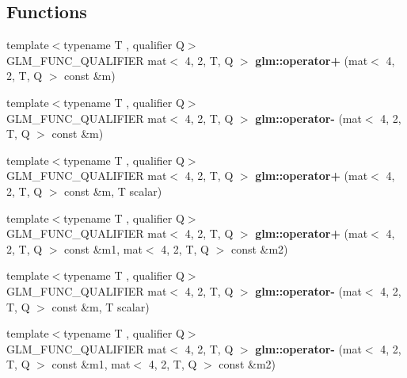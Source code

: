 \subsection*{Functions}
\begin{DoxyCompactItemize}
\item 
\mbox{\label{type__mat4x2_8inl_a5a24a65cc59a2bd4c7770a67105bc7f2}} 
{\footnotesize template$<$typename T , qualifier Q$>$ }\\G\+L\+M\+\_\+\+F\+U\+N\+C\+\_\+\+Q\+U\+A\+L\+I\+F\+I\+ER mat$<$ 4, 2, T, Q $>$ {\bfseries glm\+::operator+} (mat$<$ 4, 2, T, Q $>$ const \&m)
\item 
\mbox{\label{type__mat4x2_8inl_ad9796904f16f8a07d97f8a3baefe44e4}} 
{\footnotesize template$<$typename T , qualifier Q$>$ }\\G\+L\+M\+\_\+\+F\+U\+N\+C\+\_\+\+Q\+U\+A\+L\+I\+F\+I\+ER mat$<$ 4, 2, T, Q $>$ {\bfseries glm\+::operator-\/} (mat$<$ 4, 2, T, Q $>$ const \&m)
\item 
\mbox{\label{type__mat4x2_8inl_aff91c1ef1cd3e33281be9320e6638697}} 
{\footnotesize template$<$typename T , qualifier Q$>$ }\\G\+L\+M\+\_\+\+F\+U\+N\+C\+\_\+\+Q\+U\+A\+L\+I\+F\+I\+ER mat$<$ 4, 2, T, Q $>$ {\bfseries glm\+::operator+} (mat$<$ 4, 2, T, Q $>$ const \&m, T scalar)
\item 
\mbox{\label{type__mat4x2_8inl_acd77373f051287456ca382530b3371fc}} 
{\footnotesize template$<$typename T , qualifier Q$>$ }\\G\+L\+M\+\_\+\+F\+U\+N\+C\+\_\+\+Q\+U\+A\+L\+I\+F\+I\+ER mat$<$ 4, 2, T, Q $>$ {\bfseries glm\+::operator+} (mat$<$ 4, 2, T, Q $>$ const \&m1, mat$<$ 4, 2, T, Q $>$ const \&m2)
\item 
\mbox{\label{type__mat4x2_8inl_ad3a99eb808e893cf4f661d4f95c3e366}} 
{\footnotesize template$<$typename T , qualifier Q$>$ }\\G\+L\+M\+\_\+\+F\+U\+N\+C\+\_\+\+Q\+U\+A\+L\+I\+F\+I\+ER mat$<$ 4, 2, T, Q $>$ {\bfseries glm\+::operator-\/} (mat$<$ 4, 2, T, Q $>$ const \&m, T scalar)
\item 
\mbox{\label{type__mat4x2_8inl_a4d6111edc1baea704f9fcf712e4f0fc2}} 
{\footnotesize template$<$typename T , qualifier Q$>$ }\\G\+L\+M\+\_\+\+F\+U\+N\+C\+\_\+\+Q\+U\+A\+L\+I\+F\+I\+ER mat$<$ 4, 2, T, Q $>$ {\bfseries glm\+::operator-\/} (mat$<$ 4, 2, T, Q $>$ const \&m1, mat$<$ 4, 2, T, Q $>$ const \&m2)

\end{DoxyCompactItemize}

